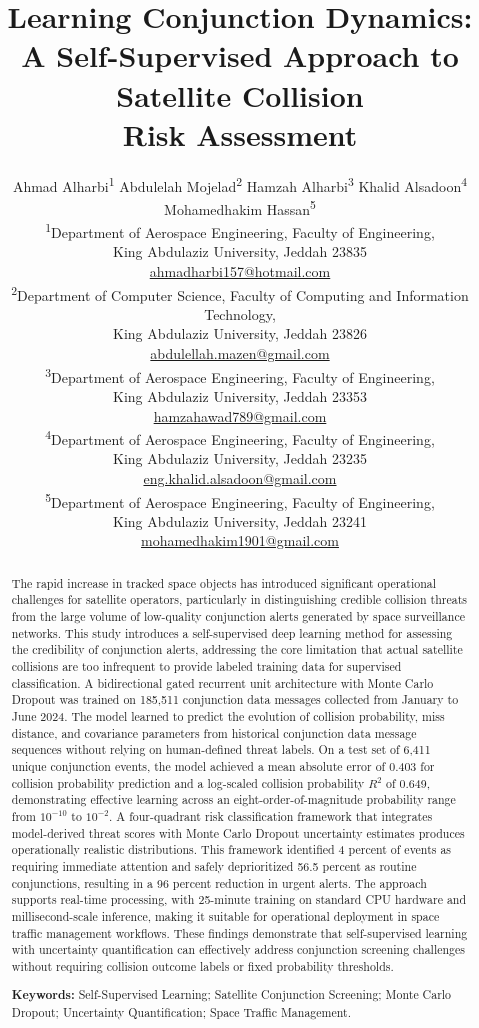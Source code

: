 \documentclass[12pt, a4paper]{article}
\title{%
    \LARGE\bfseries Learning Conjunction Dynamics:\\
    A Self-Supervised Approach to Satellite Collision\\
    Risk Assessment
}
\author{
    Ahmad Alharbi\textsuperscript{1} \quad
    Abdulelah Mojelad\textsuperscript{2} \quad
    Hamzah Alharbi\textsuperscript{3} \quad
    Khalid Alsadoon\textsuperscript{4} \quad
    Mohamedhakim Hassan\textsuperscript{5}
    \\[0.8em]
    \small\textsuperscript{1}Department of Aerospace Engineering, Faculty of Engineering,\\
    King Abdulaziz University, Jeddah 23835\\
    \href{mailto:ahmadharbi157@hotmail.com}{ahmadharbi157@hotmail.com}\\[0.4em]
    \small\textsuperscript{2}Department of Computer Science, Faculty of Computing and Information Technology,\\
    King Abdulaziz University, Jeddah 23826\\
    \href{mailto:abdulellah.mazen@gmail.com}{abdulellah.mazen@gmail.com}\\[0.4em]
    \small\textsuperscript{3}Department of Aerospace Engineering, Faculty of Engineering,\\
    King Abdulaziz University, Jeddah 23353\\
    \href{mailto:hamzahawad789@gmail.com}{hamzahawad789@gmail.com}\\[0.4em]
    \small\textsuperscript{4}Department of Aerospace Engineering, Faculty of Engineering,\\
    King Abdulaziz University, Jeddah 23235\\
    \href{mailto:eng.khalid.alsadoon@gmail.com}{eng.khalid.alsadoon@gmail.com}\\[0.4em]
    \small\textsuperscript{5}Department of Aerospace Engineering, Faculty of Engineering,\\
    King Abdulaziz University, Jeddah 23241\\
    \href{mailto:mohamedhakim1901@gmail.com}{mohamedhakim1901@gmail.com}
}
\date{}
\begin{document}
\maketitle
\thispagestyle{empty}

\begin{abstract}
The rapid increase in tracked space objects has introduced significant operational challenges for satellite operators, particularly in distinguishing credible collision threats from the large volume of low-quality conjunction alerts generated by space surveillance networks. This study introduces a self-supervised deep learning method for assessing the credibility of conjunction alerts, addressing the core limitation that actual satellite collisions are too infrequent to provide labeled training data for supervised classification. A bidirectional gated recurrent unit architecture with Monte Carlo Dropout was trained on 185,511 conjunction data messages collected from January to June 2024. The model learned to predict the evolution of collision probability, miss distance, and covariance parameters from historical conjunction data message sequences without relying on human-defined threat labels. On a test set of 6,411 unique conjunction events, the model achieved a mean absolute error of 0.403 for collision probability prediction and a log-scaled collision probability $R^2$ of 0.649, demonstrating effective learning across an eight-order-of-magnitude probability range from $10^{-10}$ to $10^{-2}$. A four-quadrant risk classification framework that integrates model-derived threat scores with Monte Carlo Dropout uncertainty estimates produces operationally realistic distributions. This framework identified 4 percent of events as requiring immediate attention and safely deprioritized 56.5 percent as routine conjunctions, resulting in a 96 percent reduction in urgent alerts. The approach supports real-time processing, with 25-minute training on standard CPU hardware and millisecond-scale inference, making it suitable for operational deployment in space traffic management workflows. These findings demonstrate that self-supervised learning with uncertainty quantification can effectively address conjunction screening challenges without requiring collision outcome labels or fixed probability thresholds.

\bigskip
\noindent\textbf{Keywords:} Self-Supervised Learning; Satellite Conjunction Screening; Monte Carlo Dropout; Uncertainty Quantification; Space Traffic Management.
\end{abstract}
\end{document}
